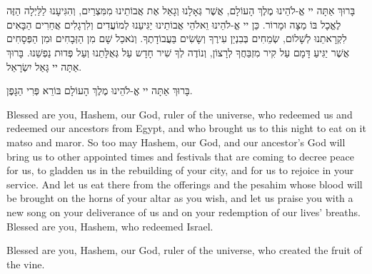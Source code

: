 \vspace{1em}


\ 

\ \\


בָּרוּךְ אַתָּה יי אֱ-לֹהֵינוּ מֶלֶךְ הָעוֹלָם, אֲשֶׁר גְּאָלָנוּ וְגָאַל אֶת אֲבוֹתֵינוּ מִמִּצְרַיִם, וְהִגִּיעָנוּ לַלַּיְלָה הַזֶּה לֶאֱכָל בּוֹ מַצָּה וּמָרוֹר. כֵּן יי אֱ-לֹהֵינוּ וֵאלֹהֵי אֲבוֹתֵינוּ יַגִּיעֵנוּ לְמוֹעֲדִים וְלִרְגָלִים אֲחֵרִים הַבָּאִים לִקְרָאתֵנוּ לְשָׁלוֹם, שְׂמֵחִים בְּבִנְיַן עִירֶךָ וְשָׂשִׂים בַּעֲבוֹדָתֶךָ. וְנֹאכַל שָׁם מִן הַזְּבָחִים וּמִן הַפְּסָחִים אֲשֶׁר יַגִּיעַ דָּמָם עַל קִיר מִזְבַּחֲךָ לְרָצוֹן, וְנוֹדֶה לְךָ שִׁיר חָדָש עַל גְּאֻלָּתֵנוּ וְעַל פְּדוּת נַפְשֵׁנוּ. בָּרוּךְ אַתָּה יי גָּאַל יִשְׂרָאֵל.

בָּרוּךְ אַתָּה יי אֱ-לֹהֵינוּ מֶלֶךְ הָעוֹלָם בּוֹרֵא פְּרִי הַגָּפֶן.

\begin{english}
Blessed are you, Hashem, our God, ruler of the universe, who redeemed us and redeemed our ancestors from Egypt, and who brought us to this night to eat on it matso and maror. So too may Hashem, our God, and our ancestor's God will bring us to other appointed times and festivals that are coming to decree peace for us, to gladden us in the rebuilding of your city, and for us to rejoice in your service. And let us eat there from the offerings and the pesahim whose blood will be brought on the horns of your altar as you wish, and let us praise you with a new song on your deliverance of us and on your redemption of our lives' breaths. Blessed are you, Hashem, who redeemed Israel.

Blessed are you, Hashem, our God, ruler of the universe, who created the fruit of the vine.
\end{english}

\begin{center}
\end{center} 